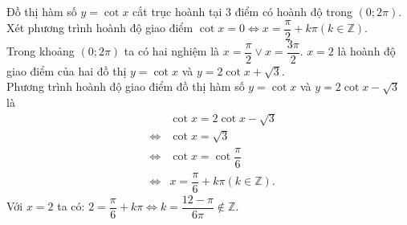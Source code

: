 \begin{ex}
{\begin{itemchoice}
\begin{center}
					\end{center}
					\itemch Đồ thị hàm số $y=\cot x$ cắt trục hoành tại 3 điểm có hoành độ trong $\left(0;2\pi \right)$.\\
					Xét phương trình hoành độ giao điểm $\cot x=0\Leftrightarrow x=\dfrac{\pi}{2}+k\pi \left(k\in \mathbb{Z}\right)$.\\
					Trong khoảng $\left(0;2\pi \right)$ ta có hai nghiệm là $x=\dfrac{\pi}{2}\vee x=\dfrac{3\pi}{2}$.
					\itemch $x=2$ là hoành độ giao điểm của hai đồ thị $y=\cot x$ và $y=2\cot x+\sqrt{3}$.\\
					Phương trình hoành độ giao điểm đồ thị hàm số $y=\cot x$ và $y=2\cot x-\sqrt{3}$ là
					\allowdisplaybreaks
					\begin{eqnarray*}
						&&\cot x=2\cot x-\sqrt{3} \\
						&\Leftrightarrow& \cot x=\sqrt{3} \\
						&\Leftrightarrow& \cot x=\cot \dfrac{\pi}{6} \\
						&\Leftrightarrow& x=\dfrac{\pi}{6}+k\pi \left(k\in \mathbb{Z}\right).
					\end{eqnarray*}
					Với $x=2$ ta có: $2=\dfrac{\pi}{6}+k\pi \Leftrightarrow k=\dfrac{12-\pi}{6\pi} \notin \mathbb{Z}$.
				\end{itemchoice}
					}
				\end{ex}


